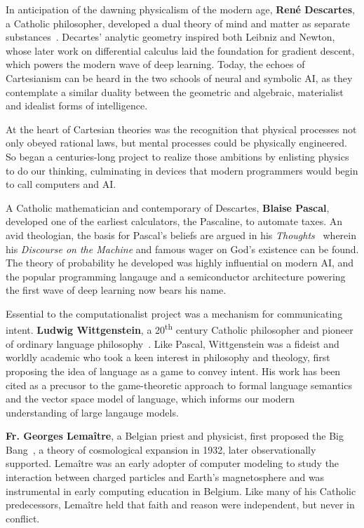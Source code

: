 \documentclass[sigplan,nonacm]{acmart}\settopmatter{printfolios=false,printccs=false,printacmref=false}
\begin{document}
  In anticipation of the dawning physicalism of the modern age, \textbf{Ren\'e Descartes}, a Catholic philosopher, developed a dual theory of mind and matter as separate substances~\cite{descartes1641meditationes}. Decartes' analytic geometry inspired both Leibniz and Newton, whose later work on differential calculus laid the foundation for gradient descent, which powers the modern wave of deep learning. Today, the echoes of Cartesianism can be heard in the two schools of neural and symbolic AI, as they contemplate a similar duality between the geometric and algebraic, materialist and idealist forms of intelligence.

  At the heart of Cartesian theories was the recognition that physical processes not only obeyed rational laws, but mental processes could be physically engineered. So began a centuries-long project to realize those ambitions by enlisting physics to do our thinking, culminating in devices that modern programmers would begin to call computers and AI.

  A Catholic mathematician and contemporary of Descartes, \textbf{Blaise Pascal}, developed one of the earliest calculators, the Pascaline, to automate taxes. An avid theologian, the basis for Pascal's beliefs are argued in his \textit{Thoughts}~\cite{pascal1670pensees} wherein his \textit{Discourse on the Machine} and famous wager on God's existence can be found. The theory of probability he developed was highly influential on modern AI, and the popular programming langauge and a semiconductor architecture powering the first wave of deep learning now bears his name.

  Essential to the computationalist project was a mechanism for communicating intent. \textbf{Ludwig Wittgenstein}, a 20\textsuperscript{th} century Catholic philosopher and pioneer of ordinary language philosophy~\cite{wittgenstein1929some}. Like Pascal, Wittgenstein was a fideist and worldly academic who took a keen interest in philosophy and theology, first proposing the idea of language as a game to convey intent. His work has been cited as a precusor to the game-theoretic approach to formal language semantics and the vector space model of language, which informs our modern understanding of large langauge models.

  \textbf{Fr. Georges Lema\^itre}, a Belgian priest and physicist, first proposed the Big Bang~\cite{lemaitre1931beginning}, a theory of cosmological expansion in 1932, later observationally supported. Lema\^itre was an early adopter of computer modeling to study the interaction between charged particles and Earth's magnetosphere and was instrumental in early computing education in Belgium. Like many of his Catholic predecessors, Lema\^itre held that faith and reason were independent, but never in conflict.
\end{document}

